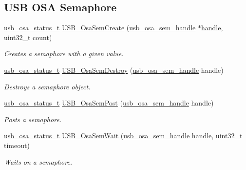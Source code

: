 \subsection*{U\-S\-B O\-S\-A Semaphore}
\begin{DoxyCompactItemize}
\item 
\hyperlink{group__usb__os__abstraction_ga8de2fb7579de0a6621bbc1776519b0a9}{usb\-\_\-osa\-\_\-status\-\_\-t} \hyperlink{group__usb__os__abstraction_ga9d4a6e4130aac6d6b65d4cf6545f6625}{U\-S\-B\-\_\-\-Osa\-Sem\-Create} (\hyperlink{group__usb__os__abstraction_ga9f0e38944e1320d10c45eaacb67185b7}{usb\-\_\-osa\-\_\-sem\-\_\-handle} $\ast$handle, uint32\-\_\-t count)
\begin{DoxyCompactList}\small\item\em Creates a semaphore with a given value. \end{DoxyCompactList}\item 
\hyperlink{group__usb__os__abstraction_ga8de2fb7579de0a6621bbc1776519b0a9}{usb\-\_\-osa\-\_\-status\-\_\-t} \hyperlink{group__usb__os__abstraction_ga078945ac6116e19459d2f38fe8feb994}{U\-S\-B\-\_\-\-Osa\-Sem\-Destroy} (\hyperlink{group__usb__os__abstraction_ga9f0e38944e1320d10c45eaacb67185b7}{usb\-\_\-osa\-\_\-sem\-\_\-handle} handle)
\begin{DoxyCompactList}\small\item\em Destroys a semaphore object. \end{DoxyCompactList}\item 
\hyperlink{group__usb__os__abstraction_ga8de2fb7579de0a6621bbc1776519b0a9}{usb\-\_\-osa\-\_\-status\-\_\-t} \hyperlink{group__usb__os__abstraction_gad44e7105ccf6f06a6dac75307c6c1b0f}{U\-S\-B\-\_\-\-Osa\-Sem\-Post} (\hyperlink{group__usb__os__abstraction_ga9f0e38944e1320d10c45eaacb67185b7}{usb\-\_\-osa\-\_\-sem\-\_\-handle} handle)
\begin{DoxyCompactList}\small\item\em Posts a semaphore. \end{DoxyCompactList}\item 
\hyperlink{group__usb__os__abstraction_ga8de2fb7579de0a6621bbc1776519b0a9}{usb\-\_\-osa\-\_\-status\-\_\-t} \hyperlink{group__usb__os__abstraction_gafe9ff8755eb9afadd0ad328ca4fe4c8c}{U\-S\-B\-\_\-\-Osa\-Sem\-Wait} (\hyperlink{group__usb__os__abstraction_ga9f0e38944e1320d10c45eaacb67185b7}{usb\-\_\-osa\-\_\-sem\-\_\-handle} handle, uint32\-\_\-t timeout)
\begin{DoxyCompactList}\small\item\em Waits on a semaphore. \end{DoxyCompactList}\end{DoxyCompactItemize}
